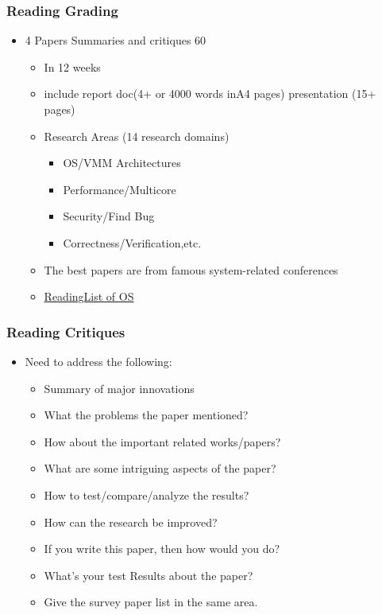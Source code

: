 \begin{frame}[plain]	
	\frametitle{Reading Grading}
	
	\begin{itemize}\Large
		\item 4 Papers Summaries and critiques 60%
		\begin{itemize}\large
			\item In 12 weeks
			\item include report doc(4+ or 4000 words inA4 pages) presentation (15+
			pages)
			\item Research Areas (14 research domains)
			\begin{itemize}	\large
				\item OS/VMM Architectures
				\item Performance/Multicore
				\item Security/Find Bug
				\item Correctness/Verification,etc.
			\end{itemize}		
			\item The best papers are from famous system-related conferences
			\item \href{https://github.com/chyyuu/aos_course/blob/master/readinglist.md}{ReadingList of OS}			
		\end{itemize}
	\end{itemize}
	
	
\end{frame}

\begin{frame}[plain]	
	\frametitle{Reading Critiques}
	
	\begin{itemize}\Large
		\item Need to address the following:
		\begin{itemize}\large
			
			\item Summary of major innovations
			\item What the problems the paper mentioned?
			\item How about the important related works/papers?
			\item What are some intriguing aspects of the paper?
			\item How to test/compare/analyze the results?
			\item How can the research be improved?
			\item If you write this paper, then how would you do?
			\item What’s your test Results about the paper?
			\item Give the survey paper list in the same area.
			
		\end{itemize}
	\end{itemize}
	
	
\end{frame}

